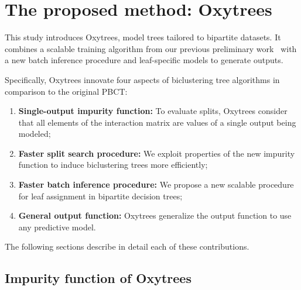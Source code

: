 \documentclass[sn-mathphys-num]{sn-jnl}%
\theoremstyle{thmstyleone}%
\theoremstyle{thmstyletwo}%
\theoremstyle{thmstylethree}%
\begin{document}
\section{The proposed method: Oxytrees}
\label{sec:oxytrees}

This study introduces Oxytrees, model trees tailored to bipartite datasets. It combines a scalable training algorithm from our previous preliminary work~\cite{ilidio_fast_2024} with a new batch inference procedure and leaf-specific models to generate outputs.

Specifically, Oxytrees innovate four aspects of biclustering tree algorithms in comparison to the original PBCT:
%
\begin{enumerate}
     \item \textbf{Single-output impurity function:} To evaluate splits, Oxytrees consider that all elements of the interaction matrix are values of a single output being modeled;
    \item \textbf{Faster split search procedure:} We exploit properties of the new impurity function to induce biclustering trees more efficiently;
    \item \textbf{Faster batch inference procedure:} We propose a new scalable procedure for leaf assignment in bipartite decision trees;
    \item \textbf{General output function:} Oxytrees generalize the output function to use any predictive model.
\end{enumerate}
%
The following sections describe in detail each of these contributions.



\subsection{Impurity function of Oxytrees}
\label{sec:oxytrees impurity}
\end{document}
